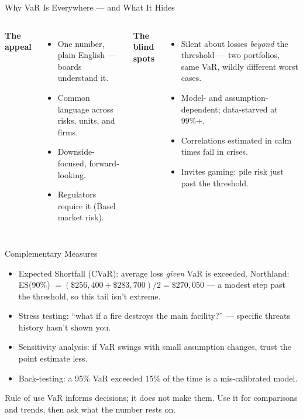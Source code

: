 \documentclass[11pt, aspectratio=169]{beamer}
\begin{document}
\begin{frame}{Why VaR Is Everywhere --- and What It Hides}
\begin{columns}[T]
\textbf{The appeal}
\begin{itemize}
  \item One number, plain English --- boards understand it.
  \item Common language across risks, units, and firms.
  \item Downside-focused, forward-looking.
  \item Regulators require it (Basel market risk).
\end{itemize}
\textbf{The blind spots}
\begin{itemize}
  \item Silent about losses \emph{beyond} the threshold --- two portfolios, same VaR, wildly different worst cases.
  \item Model- and assumption-dependent; data-starved at 99\%+.
  \item Correlations estimated in calm times fail in crises.
  \item Invites gaming: pile risk just past the threshold.
\end{itemize}
\end{columns}
\end{frame}

\begin{frame}{Complementary Measures}
\begin{itemize}
  \item \alert{Expected Shortfall (CVaR)}: average loss \emph{given} VaR is exceeded. Northland: ES(90\%) $= (\$256{,}400 + \$283{,}700)/2 = \$270{,}050$ --- a modest step past the threshold, so this tail isn't extreme.
  \item \alert{Stress testing}: ``what if a fire destroys the main facility?'' --- specific threats history hasn't shown you.
  \item \alert{Sensitivity analysis}: if VaR swings with small assumption changes, trust the point estimate less.
  \item \alert{Back-testing}: a 95\% VaR exceeded 15\% of the time is a mis-calibrated model.
\end{itemize}
\medskip
\begin{block}{Rule of use}
VaR informs decisions; it does not make them. Use it for comparisons and trends, then ask what the number rests on.
\end{block}
\end{frame}
\end{document}
